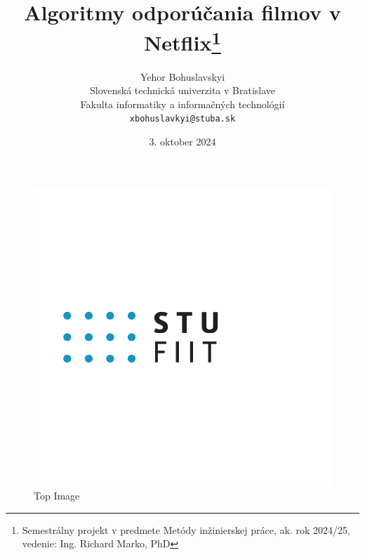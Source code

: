 \documentclass[10pt,twoside,slovak,a4paper]{article}
\title{Algoritmy odporúčania filmov v Netflix\thanks{Semestrálny projekt v predmete Metódy inžinierskej práce, ak. rok 2024/25, vedenie: Ing. Richard Marko, PhD}}
\author{Yehor Bohuslavskyi\\[2pt]
	{\small Slovenská technická univerzita v Bratislave}\\
	{\small Fakulta informatiky a informačných technológií}\\
	{\small \texttt{xbohuslavkyi@stuba.sk}}
	}
\date{\small 3. oktober 2024}
\begin{document}
\begin{figure}[h!]
  \centering
  \includegraphics[width=\textwidth]{Images/fiit_logo.png} 
  \caption{Top Image}
\end{figure}

\maketitle
\end{document}
